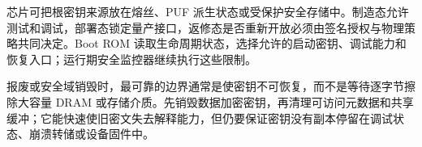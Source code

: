 
芯片可把根密钥来源放在熔丝、PUF 派生状态或受保护安全存储中。制造态允许测试和调试，部署态锁定量产接口，返修态是否重新开放必须由签名授权与物理策略共同决定。Boot ROM 读取生命周期状态，选择允许的启动密钥、调试能力和恢复入口；运行期安全监控器继续执行这些限制。

报废或安全域销毁时，最可靠的边界通常是使密钥不可恢复，而不是等待逐字节擦除大容量 DRAM 或存储介质。先销毁数据加密密钥，再清理可访问元数据和共享缓冲；它能快速使旧密文失去解释能力，但仍要保证密钥没有副本停留在调试状态、崩溃转储或设备固件中。
